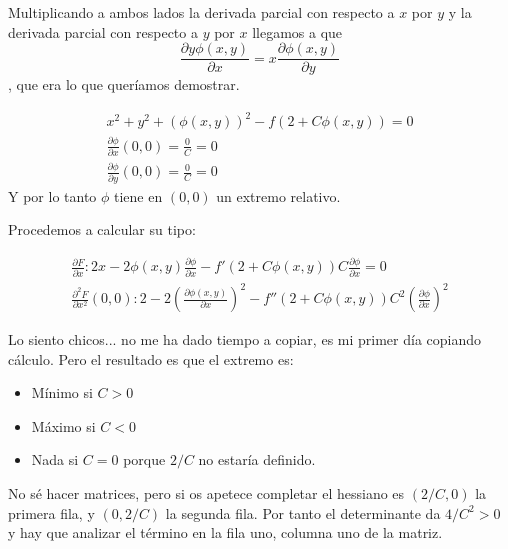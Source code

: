 \begin{problem}[1]
Multiplicando a ambos lados la derivada parcial con respecto a $x$ por $y$ y la derivada parcial con respecto a $y$ por $x$ llegamos a que \[ \frac{\partial y \phi (x,y)}{\partial  x} = x\frac{\partial  \phi (x,y)}{\partial  y} \], que era lo que queríamos demostrar.

\spart 

\begin{gather*}
x^2 + y^2 + (\phi (x,y))^2 -f(2+C\phi (x,y)) = 0 \\
\frac{\partial  \phi}{\partial  x}(0,0) = \frac{0}{C} = 0 \\
\frac{\partial  \phi}{\partial  y}(0,0) = \frac{0}{C} = 0
\end{gather*}
Y por lo tanto $\phi$ tiene en $(0,0)$ un extremo relativo.

Procedemos a calcular su tipo:

\begin{gather*}
\frac{\partial  F}{\partial  x}: 2x-2\phi (x,y)\frac{\partial  \phi}{\partial  x}-f'(2+C\phi (x, y))C\frac{\partial  \phi}{\partial  x} = 0 \\
\frac{\partial  ^2 F}{\partial  x^2}(0,0): 2-2\left(\frac{\partial  \phi (x,y)}{\partial  x}\right)^2 - f''(2+C\phi (x,y))C^2\left(\frac{\partial  \phi}{\partial  x}\right)^2
\end{gather*}

Lo siento chicos... no me ha dado tiempo a copiar, es mi primer día copiando cálculo. Pero el resultado es que el extremo es:

\begin{itemize}
\item Mínimo si $C>0$
\item Máximo si $C<0$
\item Nada si $C=0$ porque $2/C$ no estaría definido. 
\end{itemize}

No sé hacer matrices, pero si os apetece completar el hessiano es $(2/C, 0)$ la primera fila, y $(0, 2/C)$ la segunda fila. Por tanto el determinante da $4/C^2 > 0$ y hay que analizar el término en la fila uno, columna uno de la matriz.
\end{problem}


